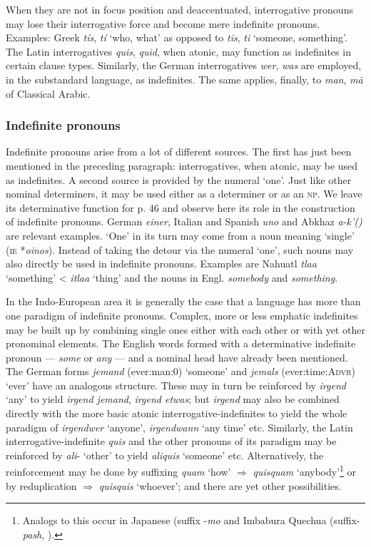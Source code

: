 When they are not in focus position and deaccentuated, interrogative pronouns may lose their interrogative force and become mere indefinite pronouns. Examples: Greek \textit{tís}, \textit{tí} ‘who, what’ as opposed to \textit{tis}, \textit{ti} ‘someone, something’. The Latin interrogatives \textit{quis}, \textit{quid}, when atonic, may function as indefinites in certain clause types. Similarly, the German interrogatives \textit{wer}, \textit{was} are employed, in the substandard language, as indefinites. The same applies, finally, to \textit{man}, \textit{m\=a} of Classical Arabic.

\subsubsection{Indefinite pronouns}
Indefinite pronouns arise from a lot of different sources. The first has just been mentioned in the preceding paragraph: interrogatives, when atonic, may be used as indefinites. A second source is provided by the numeral ‘one’. Just like other nominal determiners, it may be used either as a determiner or as an \textsc{np}. We leave its determinative function for p. 46 and observe here its role in the construction of indefinite pronouns. German \textit{einer}, Italian and Spanish \textit{uno} and Abkhaz \textit{a-k'()} are relevant examples. ‘One’ in its turn may come from a noun meaning ‘single’ (\textsc{ie} *\textit{oinos}). Instead of taking the detour via the numeral ‘one’, such nouns may also directly be used in indefinite pronouns. Examples are Nahuatl \textit{tlaa} ‘something’ {\textless} \textit{itlaa} ‘thing’ and the nouns in Engl. \textit{somebody} and \textit{something}.

In the Indo-European area it is generally the case that a language has more than one paradigm of indefinite pronouns. Complex, more or less emphatic indefinites may be built up by combining single ones either with each other or with yet other pronominal elements. The English words formed with a determinative indefinite pronoun — \textit{some} or \textit{any} — and a nominal head have already been mentioned. The German forms \textit{jemand} (ever:man:0) ‘someone’ and \textit{jemals} (ever:time:\textsc{Advr}) ‘ever’ have an analogous structure. These may in turn be reinforced by \textit{irgend} ‘any’ to yield \textit{irgend jemand}, \textit{irgend etwas}; but \textit{irgend} may also be combined directly with the more basic atonic interrogative-indefinites to yield the whole paradigm of \textit{irgendwer} ‘anyone’, \textit{irgendwann} ‘any time’ etc. Similarly, the Latin interrogative-indefinite \textit{quis} and the other pronouns of its paradigm may be reinforced by \textit{ali}{}- ‘other’ to yield \textit{aliquis} ‘someone’ etc. Alternatively, the reinforcement may be done by suffixing \textit{quam} ‘how’ $\Rightarrow $ \textit{quisquam} ‘anybody’\footnote{Analogs to this occur in Japanese (suffix -\textit{mo} and Imbabura Quechua (suffix-\textit{pash}, \citet[131]{Cole1982}).} or by reduplication $\Rightarrow $ \textit{quisquis} ‘whoever’; and there are yet other possibilities.

